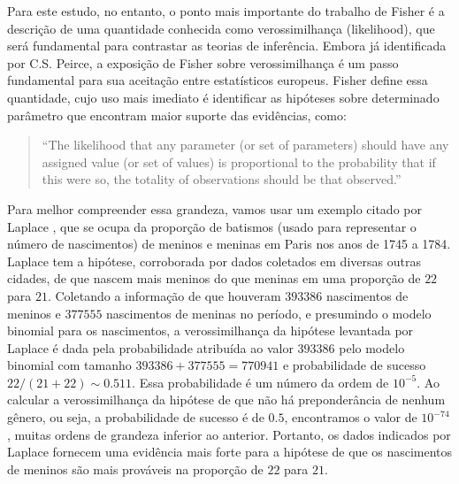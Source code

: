 Para este estudo, no entanto, o ponto mais importante do trabalho de Fisher é a descrição de uma quantidade conhecida como
verossimilhança (likelihood), que será fundamental para contrastar as teorias de inferência. Embora já identificada por C.S.
Peirce, a exposição de Fisher sobre verossimilhança é um passo fundamental para sua aceitação entre estatísticos europeus.
Fisher define essa quantidade,
cujo uso mais imediato é identificar as hipóteses sobre determinado parâmetro que encontram maior suporte das evidências,
como:

\begin{quote}
``The likelihood that any parameter (or set of parameters) should have
any assigned value (or set of values) is proportional to the probability
that if this were so, the totality of observations should be that observed.''\citep{Fisher1922}
\end{quote}

Para melhor compreender essa grandeza, vamos usar um exemplo citado por Laplace \citep{Laplace1814}, que se ocupa da 
proporção de batismos (usado para representar o número de nascimentos) de meninos e meninas em Paris nos anos 
de 1745 a 1784. Laplace tem a hipótese, corroborada por dados coletados em diversas outras cidades, de que nascem mais meninos
do que meninas em uma proporção de $22$ para $21$. Coletando a
informação de que houveram $393386$ nascimentos de meninos e $377555$
nascimentos de meninas no período, e presumindo o modelo binomial para os nascimentos, a verossimilhança da hipótese levantada
por Laplace é dada pela probabilidade atribuída ao valor $393386$ pelo modelo binomial com tamanho $393386 + 377555 = 770941$
e probabilidade de sucesso $22/(21+22) \sim 0.511$. Essa probabilidade é um número da ordem de $10^{-5}$. Ao calcular a 
verossimilhança da hipótese de que não há preponderância de nenhum gênero, ou seja, a probabilidade de sucesso é de $0.5$, 
encontramos o valor de $10^{-74}$, muitas ordens de grandeza inferior ao anterior. Portanto, os dados indicados por Laplace
fornecem uma evidência mais forte para a hipótese de que os nascimentos de meninos são mais prováveis na proporção de $22$
para $21$. %


